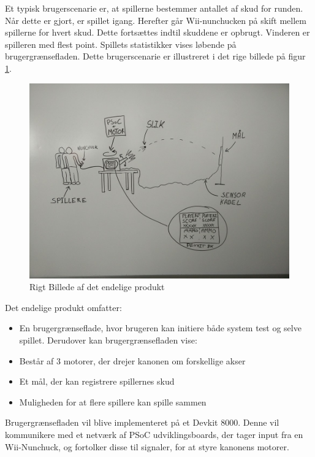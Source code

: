 \noindent Et typisk brugerscenarie er, at spillerne bestemmer antallet af skud for runden. Når dette er gjort, er spillet igang. Herefter går Wii-nunchucken på skift mellem spillerne for hvert skud. Dette fortsættes indtil skuddene er opbrugt. Vinderen er spilleren med flest point. Spillets statistikker vises løbende på brugergrænsefladen. Dette brugerscenarie er illustreret i det rige billede på figur \ref{fig:RigtBillede}.

\begin{figure}[H]
	\centering
	\includegraphics[width=\textwidth]{Projektformulering/images/rigtBillede}
	\caption{Rigt Billede af det endelige produkt}
	\label{fig:RigtBillede}
\end{figure}

Det endelige produkt omfatter:
\begin{itemize}
	\item{En brugergrænseflade, hvor brugeren kan initiere både system test og selve spillet. Derudover kan brugergrænsefladen vise:}
	\item{Består af 3 motorer, der drejer kanonen om forskellige akser}
	\item{Et mål, der kan registrere spillernes skud}
	\item {Muligheden for at flere spillere kan spille sammen}
\end{itemize}

\noindent Brugergrænsefladen vil blive implementeret på et Devkit 8000. Denne vil kommunikere med et netværk af PSoC udviklingsboards, der tager input fra en Wii-Nunchuck, og fortolker disse til signaler, for at styre kanonens motorer.
